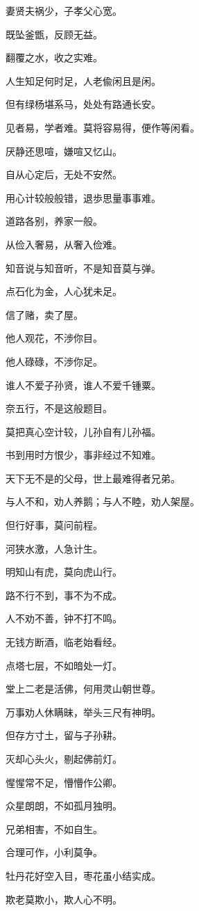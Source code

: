 \documentclass[12pt,oneside]{book}
\begin{document}
妻贤夫祸少，子孝父心宽。

既坠釜甑，反顾无益。

翻覆之水，收之实难。

人生知足何时足，人老偸闲且是闲。

但有绿杨堪系马，处处有路通长安。

见者易，学者难。莫将容易得，便作等闲看。

厌静还思喧，嫌喧又忆山。

自从心定后，无处不安然。

用心计较般般错，退歩思量事事难。

道路各别，养家一般。

从俭入奢易，从奢入俭难。

知音说与知音听，不是知音莫与弹。

点石化为金，人心犹未足。

信了赌，卖了屋。

他人观花，不渉你目。

他人碌碌，不渉你足。

谁人不爱子孙贤，谁人不爱千锺粟。

奈五行，不是这般题目。

莫把真心空计较，儿孙自有儿孙福。

书到用时方恨少，事非经过不知难。

天下无不是的父母，世上最难得者兄弟。

与人不和，劝人养鹅；与人不睦，劝人架屋。

但行好事，莫问前程。

河狭水激，人急计生。

明知山有虎，莫向虎山行。

路不行不到，事不为不成。

人不劝不善，钟不打不鸣。

无钱方断酒，临老始看经。

点塔七层，不如暗处一灯。

堂上二老是活佛，何用灵山朝世尊。

万事劝人休瞒昧，举头三尺有神明。

但存方寸土，留与子孙耕。

灭却心头火，剔起佛前灯。

惺惺常不足，懵懵作公卿。

众星朗朗，不如孤月独明。

兄弟相害，不如自生。

合理可作，小利莫争。

牡丹花好空入目，枣花虽小结实成。

欺老莫欺小，欺人心不明。
\end{document}
